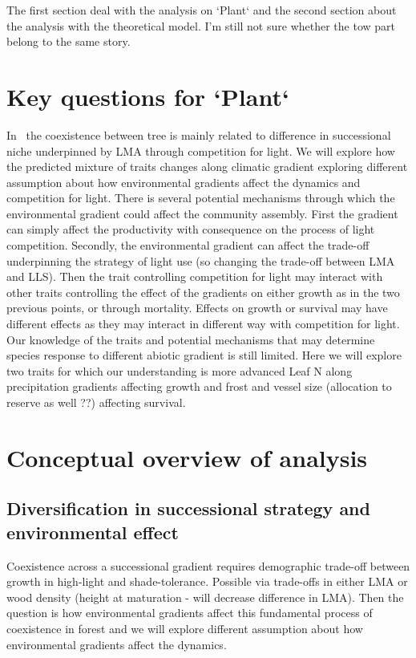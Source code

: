 \documentclass[a4paper,11pt]{article}
\begin{document}
The first section deal with the analysis on `Plant` and the second section about the analysis with the theoretical model. I'm still not sure whether the tow part belong to the same story.

\section{Key questions for `Plant`}

In \plant\ the coexistence between tree is mainly related to difference in successional niche underpinned by LMA through competition for light. We will explore how the predicted mixture of traits changes along climatic gradient exploring different assumption about how environmental gradients
affect the dynamics and competition for light. There is several
potential mechanisms through which the environmental gradient could
affect the community assembly. First the gradient can simply affect
the productivity with consequence on the process of light
competition. Secondly, the environmental gradient can affect the
trade-off underpinning the strategy of light use (so changing the
trade-off between LMA and LLS). Then the trait controlling competition
for light may interact with other traits controlling the effect of the
gradients on either growth as in the two previous points, or through
mortality. Effects on growth or survival may have different effects as
they may interact in different way with competition for light. Our knowledge of the traits and potential mechanisms that
may determine species response to different abiotic gradient is still
limited. Here we will explore two traits for which our understanding
is more advanced Leaf N along precipitation gradients affecting growth
and frost and vessel size (allocation to reserve as well ??) affecting
survival.

\section{Conceptual overview of analysis}

\subsection{Diversification in successional strategy and environmental effect}

Coexistence across a successional gradient requires demographic trade-off between growth in high-light and shade-tolerance. Possible via trade-offs in either LMA or wood density (height at maturation - will decrease difference in LMA). Then the question is how environmental gradients affect this fundamental process of coexistence in forest and we will explore different assumption about how environmental gradients
affect the dynamics.
\end{document}
